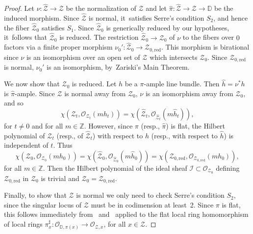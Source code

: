 \documentclass[JEP,XML,SOM,Unicode,published]{cedram}
\newcommand{\DD}{{\mathbb D}}
\newcommand{\ZZ}{{\mathbb Z}}\let\Z\ZZ
\newcommand\cO{\mathcal{O}}
\theoremstyle{definition}
\def\citestacks#1{\cite[\href{https://stacks.math.columbia.edu/tag/#1}{Tag #1}]{stacks-project}}
\begin{document}
\begin{proof}
Let $\nu\colon\widehat{\mathcal{Z}}\to\mathcal{Z}$ be the normalization of $\mathcal{Z}$ and let $\widehat{\pi}\colon \widehat{\mathcal{Z}} \to \mathcal{Z} \to \DD$ be the induced morphism.
Since $\widehat{\mathcal{Z}}$ is normal, it~satisfies Serre's condition $S_2$, and hence the fiber $\widehat{\mathcal{Z}}_0$ satisfies $S_1$.
Since $\widehat{\mathcal{Z}}_0$ is generically reduced by our hypotheses, it~follows that $\widehat{\mathcal{Z}}_0$ is reduced.
The restriction $\widehat{\mathcal{Z}}_0 \to \mathcal{Z}_0$ of $\nu$ to the fibers over $0$ factors via a finite proper morphism $\nu_0': \widehat{\mathcal{Z}}_0 \to \mathcal{Z}_{0,\mathrm{red}}$.
This morphism is birational since $\nu$ is an isomorphism over an open set of $\mathcal{Z}$ which intersects $\mathcal{Z}_0$.
Since $\mathcal{Z}_{0,\mathrm{red}}$ is normal, $\nu_0'$ is an isomorphism, by~Zariski's Main Theorem.

We now show that $\mathcal{Z}_0$ is reduced.
Let $h$ be a $\pi$-ample line bundle.
Then $\widehat{h}=\nu^* h$ is $\widehat{\pi}$-ample.
Since $\mathcal{Z}$ is normal away from $\mathcal{Z}_0$, $\nu$ is an isomorphism away from $\mathcal{Z}_0$, and so
\[
\chi(\mathcal{Z}_t,\mathcal{O}_{\mathcal{Z}_t}(mh_t))=\chi(\widehat{\mathcal{Z}}_t,\mathcal{O}_{\widehat{\mathcal{Z}}_t} (m\widehat{h}_t)),
\]
for $t \neq 0$ and for all $m\in\ZZ$.
However, since $\pi$ (resp., $\widehat{\pi}$) is flat, the Hilbert polynomial of $\mathcal{Z}_t$ (resp., of $\widehat{\mathcal{Z}}_t$) with respect to $h$ (resp., with respect to $\widehat{h}$) is independent of $t$.
Thus
\[
\chi(\mathcal{Z}_0,\mathcal{O}_{\mathcal{Z}_0}(mh_0))=\chi(\widehat{\mathcal{Z}}_0,\mathcal{O}_{\widehat{\mathcal{Z}}_0} (m\widehat{h}_0))=\chi(\mathcal{Z}_{0,\mathrm{red}},\mathcal{O}_{\mathcal{Z}_{0,\mathrm{red}}}(mh_0)),
\]
for all $m\in\ZZ$.
Then the Hilbert polynomial of the ideal sheaf $\mathcal{I} \subset \mathcal{O}_{\mathcal{Z}_0}$ defining $\mathcal{Z}_{0,\mathrm{red}}$ in $\mathcal{Z}_0$ is trivial and $\mathcal{Z}_0=\mathcal{Z}_{0,\mathrm{red}}$.

Finally, to show that $\mathcal{Z}$ is normal we only need to check Serre's condition $S_2$, since the singular locus of $\mathcal{Z}$ must be in codimension at least~2.
Since $\pi$ is flat, this follows immediately from~\citestacks{00ON} and~\citestacks{0337} applied to the flat local ring homomorphism of local rings $\pi_x^{\sharp}\colon\cO_{\DD,\pi(x)}\to \cO_{\mathcal{Z},x}$, for all $x\in \mathcal{Z}$.
\end{proof}
\end{document}
